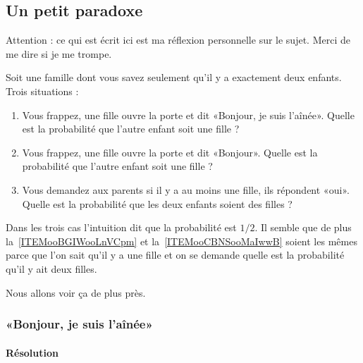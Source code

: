\subsection{Un petit paradoxe}
\label{subSecGXVYooTDdZaB}

Attention : ce qui est écrit ici est ma réflexion personnelle sur le sujet. Merci de me dire si je me trompe.

Soit une famille dont vous savez seulement qu'il y a exactement deux enfants. Trois situations :
\begin{enumerate}
	\item       \label{ITEMooNUPAooWCXwBE}
	      Vous frappez, une fille ouvre la porte et dit «Bonjour, je suis l'aînée». Quelle est la probabilité que l'autre enfant soit une fille ?
	\item   \label{ITEMooBGIWooLnVCpm}
	      Vous frappez, une fille ouvre la porte et dit «Bonjour». Quelle est la probabilité que l'autre enfant soit une fille ?
	\item       \label{ITEMooCBNSooMaIwwB}
	      Vous demandez aux parents si il y a au moins une fille, ils répondent «oui». Quelle est la probabilité que les deux enfants soient des filles ?
\end{enumerate}
Dans les trois cas l'intuition dit que la probabilité est \( 1/2\). Il semble que de plus la~\ref{ITEMooBGIWooLnVCpm} et la~\ref{ITEMooCBNSooMaIwwB} soient les mêmes parce que l'on sait qu'il y a une fille et on se demande quelle est la probabilité qu'il y ait deux filles.

Nous allons voir ça de plus près.

\subsubsection{«Bonjour, je suis l'aînée»}

\paragraph{Résolution}

